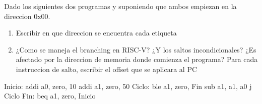 \begin{enunciado}{\ejercicio}
    Dado los siguientes dos programas y suponiendo que ambos empiezan en la
direccion 0x00.

    \begin{enumerate}
        \item Escribir en que direccion se encuentra cada etiqueta
        \item ¿Como se maneja el branching en RISC-V? ¿Y los saltos incondicionales? ¿Es afectado
        por la direccion de memoria donde comienza el programa? Para cada instruccion de
        salto, escribir el offset que se aplicara al PC
    \end{enumerate}

    \begin{riscv}
        Inicio: addi a0, zero, 10
        addi a1, zero, 50
        Ciclo: ble a1, zero, Fin
        sub a1, a1, a0
        j Ciclo
        Fin: beq a1, zero, Inicio
    \end{riscv}
    

    
    \end{enunciado}
    